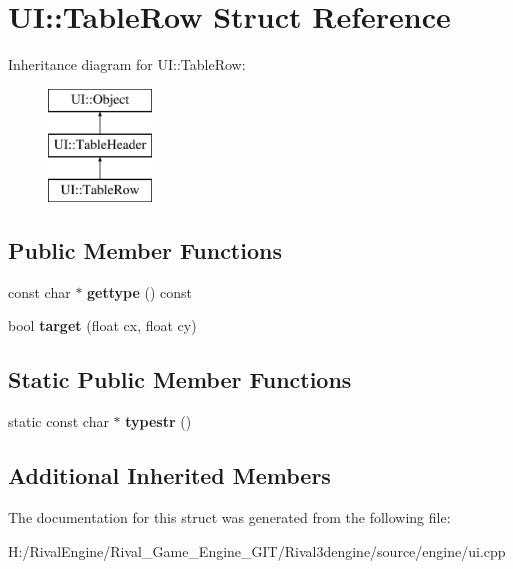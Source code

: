 \hypertarget{struct_u_i_1_1_table_row}{}\section{UI\+:\+:Table\+Row Struct Reference}
\label{struct_u_i_1_1_table_row}
Inheritance diagram for UI\+:\+:Table\+Row\+:\begin{figure}[H]
\begin{center}
\leavevmode
\includegraphics[height=3.000000cm]{struct_u_i_1_1_table_row}
\end{center}
\end{figure}
\subsection*{Public Member Functions}
\begin{DoxyCompactItemize}
\item 
\mbox{\label{struct_u_i_1_1_table_row_aec396d2d0731d3767ba594cd94abb134}} 
const char $\ast$ {\bfseries gettype} () const
\item 
\mbox{\label{struct_u_i_1_1_table_row_a09f4e80ac60cfa5d2d5e032301db2fb4}} 
bool {\bfseries target} (float cx, float cy)
\end{DoxyCompactItemize}
\subsection*{Static Public Member Functions}
\begin{DoxyCompactItemize}
\item 
\mbox{\label{struct_u_i_1_1_table_row_ae9cce1ec042b4bb99017256d1f65e1f3}} 
static const char $\ast$ {\bfseries typestr} ()
\end{DoxyCompactItemize}
\subsection*{Additional Inherited Members}


The documentation for this struct was generated from the following file\+:\begin{DoxyCompactItemize}
\item 
H\+:/\+Rival\+Engine/\+Rival\+\_\+\+Game\+\_\+\+Engine\+\_\+\+G\+I\+T/\+Rival3dengine/source/engine/ui.\+cpp\end{DoxyCompactItemize}
